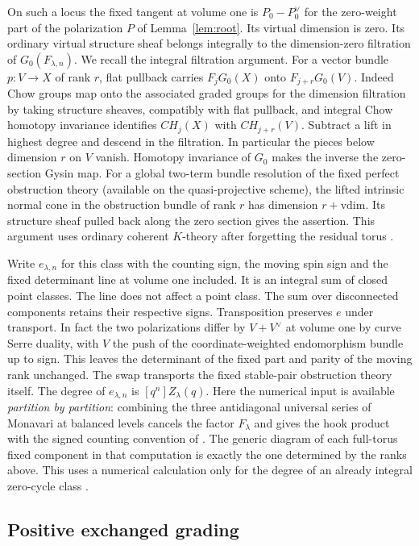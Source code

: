 On such a locus the fixed tangent at volume one is $P_0-P_0^\vee$ for the zero-weight part of the polarization $P$ of Lemma~\ref{lem:root}. Its virtual dimension is zero. Its ordinary virtual structure sheaf belongs integrally to the dimension-zero filtration of $G_0(F_{\lambda,n})$. We recall the integral filtration argument. For a vector bundle $p:V\to X$ of rank $r$, flat pullback carries $F_jG_0(X)$ onto $F_{j+r}G_0(V)$. Indeed Chow groups map onto the associated graded groups for the dimension filtration by taking structure sheaves, compatibly with flat pullback, and integral Chow homotopy invariance identifies $CH_j(X)$ with $CH_{j+r}(V)$. Subtract a lift in highest degree and descend in the filtration. In particular the pieces below dimension $r$ on $V$ vanish. Homotopy invariance of $G_0$ makes the inverse the zero-section Gysin map. For a global two-term bundle resolution of the fixed perfect obstruction theory (available on the quasi-projective scheme), the lifted intrinsic normal cone in the obstruction bundle of rank $r$ has dimension $r+\mathrm{vdim}$. Its structure sheaf pulled back along the zero section gives the assertion. This argument uses ordinary coherent $K$-theory after forgetting the residual torus \cite[\S3]{FG}.

Write $e_{\lambda,n}$ for this class with the counting sign, the moving spin sign and the fixed determinant line at volume one included. It is an integral sum of closed point classes. The line does not affect a point class. The sum over disconnected components retains their respective signs. Transposition preserves $e$ under transport. In fact the two polarizations differ by $V+V^\vee$ at volume one by curve Serre duality, with $V$ the push of the coordinate-weighted endomorphism bundle up to sign. This leaves the determinant of the fixed part and parity of the moving rank unchanged. The swap transports the fixed stable-pair obstruction theory itself. The degree of $e_{\lambda,n}$ is $[q^n]Z_\lambda(q)$. Here the numerical input is available \emph{partition by partition}: combining the three antidiagonal universal series of Monavari at balanced levels cancels the factor $F_\lambda$ and gives the hook product with the signed counting convention of \cite{W}. The generic diagram of each full-torus fixed component in that computation is exactly the one determined by the ranks above. This uses a numerical calculation only for the degree of an already integral zero-cycle class \cite[Theorem~1.7 and \S9]{M}.

\subsection{Positive exchanged grading}


